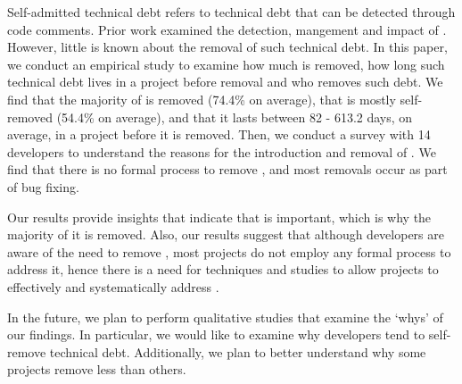 Self-admitted technical debt refers to technical debt that can be detected through code comments. Prior work examined the detection, mangement and impact of \SATD. However, little is known about the removal of such technical debt. In this paper, we conduct an empirical study to examine how much \SATD is removed, how long such technical debt lives in a project before removal and who removes such debt. We find that the majority of \SATD is removed (74.4\% on average), that \SATD is mostly self-removed (54.4\% on average), and that it lasts between 82 - 613.2 days, on average, in a project before it is removed. Then, we conduct a survey with 14 developers to understand the reasons for the introduction and removal of \SATD. We find that there is no formal process to remove \SATD, and most removals occur as part of bug fixing.

Our results provide insights that indicate that \SATD is important, which is why the majority of it is removed. Also, our results suggest that although developers are aware of the need to remove \SATD, most projects do not employ any formal process to address it, hence there is a need for techniques and studies to allow projects to effectively and systematically address \SATD.

In the future, we plan to perform qualitative studies that examine the `whys' of our findings. In particular, we would like to examine why developers tend to self-remove technical debt. Additionally, we plan to better understand why some projects remove less \SATD than others.